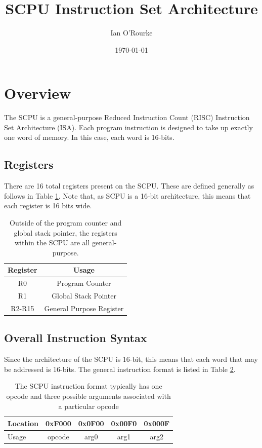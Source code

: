 \documentclass{article}
\title{SCPU Instruction Set Architecture}
\author{Ian O'Rourke}
\date{\today}
\begin{document}
\maketitle

\section{Overview}


The SCPU is a general-purpose Reduced Instruction Count (RISC) Instruction Set Architecture (ISA). Each program instruction is designed to take up exactly one word of memory. In this case, each word is 16-bits.

\subsection{Registers}

There are 16 total registers present on the SCPU. These are defined generally as follows in Table \ref{table:register-setup}. Note that, as SCPU is a 16-bit architecture, this means that each register is 16 bits wide.

\begin{table}[h!]
	\centering
	\begin{tabular}{c|c}
		\hline
		Register & Usage \\
		\hline
		R0 & Program Counter \\
		R1 & Global Stack Pointer \\
		R2-R15 & General Purpose Register \\
		\hline
	\end{tabular}
	\caption{Outside of the program counter and global stack pointer, the registers within the SCPU are all general-purpose.}
	\label{table:register-setup}
\end{table}

\subsection{Overall Instruction Syntax}

Since the architecture of the SCPU is 16-bit, this means that each word that may be addressed is 16-bits. The general instruction format is listed  in Table \ref{table:instruction-formatting}.

\begin{table}[h!]
	\centering
	\begin{tabular}{l|cccc}
		\hline
		Location & 0xF000 & 0x0F00 & 0x00F0 & 0x000F \\
		\hline
		Usage & opcode & arg0 & arg1 & arg2 \\
		\hline
	\end{tabular}
	\caption{The SCPU instruction format typically has one opcode and three possible arguments associated with a particular opcode}
	\label{table:instruction-formatting}
\end{table}
\end{document}
